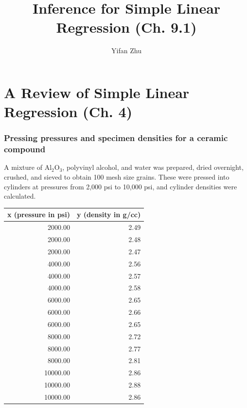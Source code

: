 \documentclass[handout]{beamer}\usepackage[]{graphicx}\usepackage[]{color}
\title{Inference for Simple Linear Regression (Ch. 9.1)}
\author{Yifan Zhu}
\date{}
\institute{Iowa State University}
\numberwithin{equation}{section}
\begin{document}
\begin{frame}
\titlepage
 \end{frame}
 

\section{A Review of Simple Linear Regression (Ch. 4)}

\begin{frame}[fragile]
\frametitle{\small Pressing pressures and specimen densities for a ceramic compound}
\scriptsize
A mixture of $\text{Al}_2\text{O}_3$, polyvinyl alcohol, and water was prepared, dried overnight, crushed, and sieved to obtain 100 mesh size grains. These were pressed into cylinders at pressures from 2,000 psi to 10,000 psi, and cylinder densities were calculated. 

\begin{table}[ht]
\centering
\begin{tabular}{rr}
 x (pressure in psi) & y (density in g/cc) \\ 
  \hline
2000.00 & 2.49 \\ 
  2000.00 & 2.48 \\ 
  2000.00 & 2.47 \\ 
  4000.00 & 2.56 \\ 
  4000.00 & 2.57 \\ 
  4000.00 & 2.58 \\ 
  6000.00 & 2.65 \\ 
  6000.00 & 2.66 \\ 
  6000.00 & 2.65 \\ 
  8000.00 & 2.72 \\ 
  8000.00 & 2.77 \\ 
  8000.00 & 2.81 \\ 
  10000.00 & 2.86 \\ 
  10000.00 & 2.88 \\ 
  10000.00 & 2.86 \\ 
  \end{tabular}
\end{table}


\end{frame}
\end{document}
